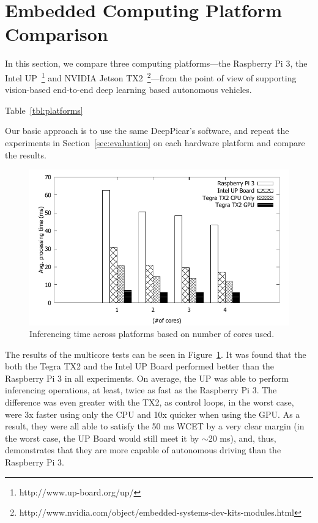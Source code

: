 
%

\section{Embedded Computing Platform Comparison}\label{sec:comparison}

In this section, we compare three computing platforms---the Raspberry
Pi 3, the Intel UP~\footnote{http://www.up-board.org/up/} and NVIDIA
Jetson
TX2~\footnote{http://www.nvidia.com/object/embedded-systems-dev-kits-modules.html}---from
the point of view of supporting vision-based end-to-end deep learning
based autonomous vehicles.

Table~\ref{tbl:platforms}
  
Our basic approach is to use the same DeepPicar's software, and repeat
the experiments in Section~\ref{sec:evaluation} on each hardware
platform and compare the results.



\begin{figure}[h]
  \centering
  \includegraphics[width=.5\textwidth]{figs/compare_core}
  \caption{Inferencing time across platforms based on number of cores 
used.}
  \label{fig:sys_core}
\end{figure}

The results of the multicore tests can be seen in 
Figure~\ref{fig:sys_core}. It was found that the both the Tegra TX2 
and the Intel UP Board performed better than the Raspberry Pi 3 in 
all experiments. On average, the UP was able to perform inferencing 
operations, at least, twice as fast as the Raspberry Pi 3. The 
difference was even greater with the TX2, as control loops, in the 
worst case, were 3x faster using only the CPU and 10x quicker when 
using the GPU. As a result, they were all able to satisfy the 50 ms 
WCET by a very clear margin (in the worst case, the UP Board would 
still meet it by $\sim$20 ms), and, thus, demonstrates that they are 
more capable of autonomous driving than the Raspberry Pi 3.

